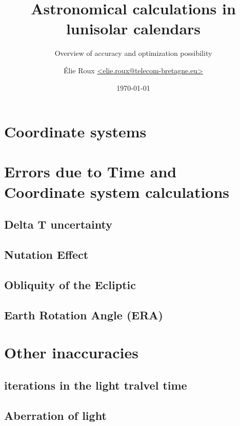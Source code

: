 \documentclass[%
a4paper,%
pagesize,%
12pt,%
parskip=off,%
bibliography=totoc,%
numbers=noenddot,%
DIV=12,%
twoside=semi,%
normalheadings%
]{scrbook}
\title{Astronomical calculations in lunisolar calendars}
\subtitle{Overview of accuracy and optimization possibility}
\author{Élie Roux \href{mailto:elie.roux@telecom-bretagne.eu}{<elie.roux@telecom-bretagne.eu>}}
\date{\today}
\let\mychapter\chapter
\let\mysection\section
\begin{document}
\maketitle

\tableofcontents
\newpage













\mychapter{Coordinate systems}

\mychapter{Errors due to Time and Coordinate system calculations}

\mysection{Delta T uncertainty}

\mysection{Nutation Effect}

\mysection{Obliquity of the Ecliptic}

\mysection{Earth Rotation Angle (ERA)}

\mychapter{Other inaccuracies}

\mysection{iterations in the light tralvel time}

\mysection{Aberration of light}



\end{document}

